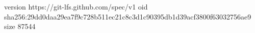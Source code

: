 version https://git-lfs.github.com/spec/v1
oid sha256:29dd0daa29ea7f9c728b511ec21c8c3d1c90395db1d39acf3800f63032756ae9
size 87544
